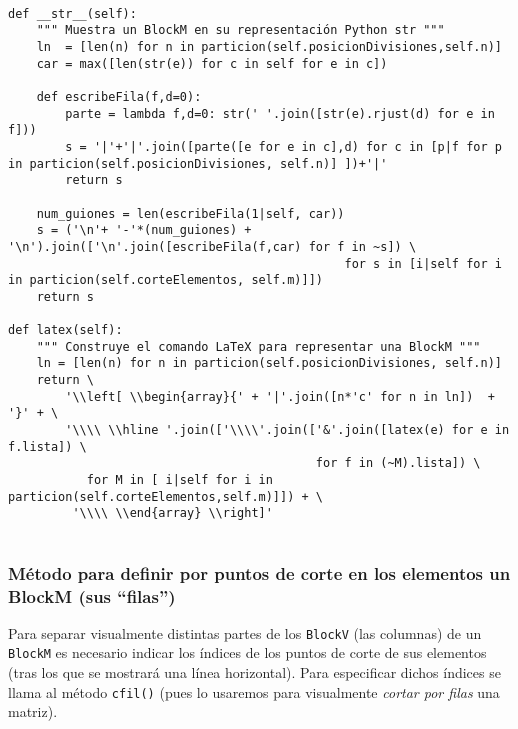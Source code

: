 \documentclass[11pt]{report}
\begin{document}
\begin{verbatim}

def __str__(self):
    """ Muestra un BlockM en su representación Python str """
    ln  = [len(n) for n in particion(self.posicionDivisiones,self.n)]
    car = max([len(str(e)) for c in self for e in c])

    def escribeFila(f,d=0):
        parte = lambda f,d=0: str(' '.join([str(e).rjust(d) for e in f])) 
        s = '|'+'|'.join([parte([e for e in c],d) for c in [p|f for p in particion(self.posicionDivisiones, self.n)] ])+'|'
        return s
    
    num_guiones = len(escribeFila(1|self, car))
    s = ('\n'+ '-'*(num_guiones) + '\n').join(['\n'.join([escribeFila(f,car) for f in ~s]) \
                                               for s in [i|self for i in particion(self.corteElementos, self.m)]])
    return s

def latex(self):
    """ Construye el comando LaTeX para representar una BlockM """
    ln = [len(n) for n in particion(self.posicionDivisiones, self.n)]                                                           
    return \
        '\\left[ \\begin{array}{' + '|'.join([n*'c' for n in ln])  + '}' + \
        '\\\\ \\hline '.join(['\\\\'.join(['&'.join([latex(e) for e in f.lista]) \
                                           for f in (~M).lista]) \
           for M in [ i|self for i in particion(self.corteElementos,self.m)]]) + \
         '\\\\ \\end{array} \\right]'
        
\end{verbatim}

\subsubsection{Método para definir por puntos de corte en los elementos un BlockM (sus ``filas'')}
\label{sec:org7d016f3}

Para separar visualmente distintas partes de los \texttt{BlockV} (las
columnas) de un \texttt{BlockM} es necesario indicar los índices de los
puntos de corte de sus elementos (tras los que se mostrará una línea
horizontal). Para especificar dichos índices se llama al método
\texttt{cfil()} (pues lo usaremos para visualmente \emph{cortar por filas} una
matriz).
\end{document}
